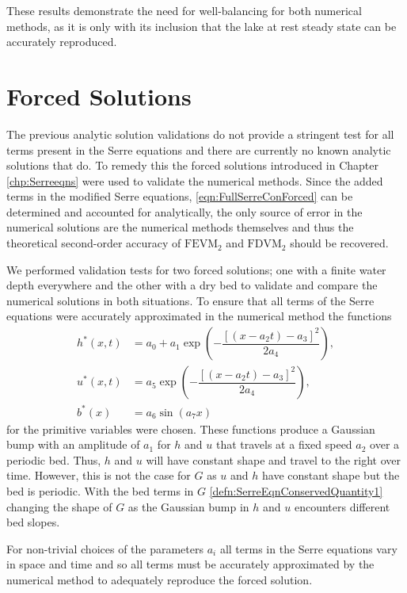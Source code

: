 These results demonstrate the need for well-balancing for both numerical methods, as it is only with its inclusion that the lake at rest steady state can be accurately reproduced. 


\section{Forced Solutions}
The previous analytic solution validations do not provide a stringent test for all terms present in the Serre equations and there are currently no known analytic solutions that do. To remedy this the forced solutions introduced in Chapter \ref{chp:Serreeqns} were used to validate the numerical methods. Since the added terms in the modified Serre equations, \eqref{eqn:FullSerreConForced} can be determined and accounted for analytically, the only source of error in the numerical solutions are the numerical methods themselves and thus the theoretical second-order accuracy of $\text{FEVM}_2$ and $\text{FDVM}_2$ should be recovered. 

We performed validation tests for two forced solutions; one with a finite water depth everywhere and the other with a dry bed to validate and compare the numerical solutions in both situations. To ensure that all terms of the Serre equations were accurately approximated in the numerical method the functions
\begin{subequations}
\begin{align}
\label{eqn:ForcedSolutionxt}
h^*(x,t) &= a_0 + a_1 \exp\left(-\dfrac{\left[\left(x - a_2 t\right) - a_3\right]^2}{2 a_4}\right), \\
u^*(x,t) &= a_5 \exp\left(-\dfrac{\left[\left(x - a_2 t\right) - a_3\right]^2}{2 a_4}\right), \\
b^*(x) &= a_6 \sin\left(a_7 x\right)
\end{align}
\end{subequations}
for the primitive variables were chosen. These functions produce a Gaussian bump with an amplitude of $a_1$ for $h$ and $u$ that travels at a fixed speed $a_2$ over a periodic bed. Thus, $h$ and $u$ will have constant shape and travel to the right over time. However, this is not the case for $G$ as $u$ and $h$ have constant shape but the bed is periodic. With the bed terms in $G$ \eqref{defn:SerreEqnConservedQuantity1} changing the shape of $G$ as the Gaussian bump in $h$ and $u$ encounters different bed slopes.

For non-trivial choices of the parameters $a_i$ all terms in the Serre equations vary in space and time and so all terms must be accurately approximated by the numerical method to adequately reproduce the forced solution. 

